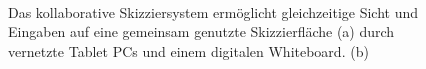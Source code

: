\begin{figure}
        \myfloatalign
         \quad
         \\
        \caption[Das kollaborative Skizziersystem.]{Das kollaborative Skizziersystem ermöglicht gleichzeitige Sicht und Eingaben auf eine gemeinsam genutzte Skizzierfläche (a) durch vernetzte Tablet PCs und einem digitalen Whiteboard. (b) }\label{fig:basteaSketchingSystemB}
\end{figure}

